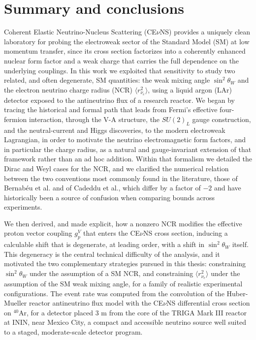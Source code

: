 \chapter{Summary and conclusions}\label{chap:summary_conclusions}
Coherent Elastic Neutrino-Nucleus Scattering (CE$\nu$NS) provides a uniquely clean laboratory for probing the electroweak sector of the Standard Model (SM) at low momentum transfer, since its cross section factorizes into a coherently enhanced nuclear form factor and a weak charge that carries the full dependence on the underlying couplings. In this work we exploited that sensitivity to study two related, and often degenerate, SM quantities: the weak mixing angle $\sin^2\theta_W$ and the electron neutrino charge radius (NCR) $\langle r_{\nu_e}^2\rangle$, using a liquid argon (LAr) detector exposed to the antineutrino flux of a research reactor. We began by tracing the historical and formal path that leads from Fermi's effective four-fermion interaction, through the V-A structure, the $SU(2)_L$ gauge construction, and the neutral-current and Higgs discoveries, to the modern electroweak Lagrangian, in order to motivate the neutrino electromagnetic form factors, and in particular the charge radius, as a natural and gauge-invariant extension of that framework rather than an ad hoc addition. Within that formalism we detailed the Dirac and Weyl cases for the NCR, and we clarified the numerical relation between the two conventions most commonly found in the literature, those of Bernab\'eu et al. and of Cadeddu et al., which differ by a factor of $-2$ and have historically been a source of confusion when comparing bounds across experiments.

We then derived, and made explicit, how a nonzero NCR modifies the effective proton vector coupling $g_p^V$ that enters the CE$\nu$NS cross section, inducing a calculable shift that is degenerate, at leading order, with a shift in $\sin^2\theta_W$ itself. This degeneracy is the central technical difficulty of the analysis, and it motivated the two complementary strategies pursued in this thesis: constraining $\sin^2\theta_W$ under the assumption of a SM NCR, and constraining $\langle r_{\nu_e}^2\rangle$ under the assumption of the SM weak mixing angle, for a family of realistic experimental configurations. The event rate was computed from the convolution of the Huber-Mueller reactor antineutrino flux model with the CE$\nu$NS differential cross section on $^{40}$Ar, for a detector placed 3 m from the core of the TRIGA Mark III reactor at ININ, near Mexico City, a compact and accessible neutrino source well suited to a staged, moderate-scale detector program.


